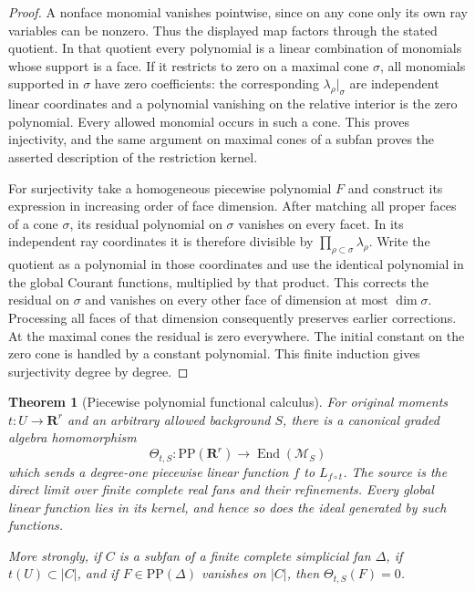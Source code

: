 \documentclass[11pt,a4paper]{article}
\numberwithin{equation}{section}
\newtheorem{theorem}{Theorem}[section]
\theoremstyle{definition}
\theoremstyle{remark}
\begin{document}
\begin{proof}
A nonface monomial vanishes pointwise, since on any cone
only its own ray variables can be nonzero. Thus the
displayed map factors through the stated quotient.
In that quotient every polynomial is a linear combination
of monomials whose support is a face. If it restricts to
zero on a maximal cone $\sigma$, all monomials supported
in $\sigma$ have zero coefficients: the corresponding
$\lambda_\rho|_\sigma$ are independent linear coordinates
and a polynomial vanishing on the relative interior is
the zero polynomial. Every allowed monomial occurs in
such a cone. This proves injectivity, and the same
argument on maximal cones of a subfan proves the asserted
description of the restriction kernel.

For surjectivity take a homogeneous piecewise polynomial
$F$ and construct its expression in increasing order of
face dimension. After matching all proper faces of a
cone $\sigma$, its residual polynomial on $\sigma$
vanishes on every facet. In its independent ray
coordinates it is therefore divisible by
$\prod_{\rho\subset\sigma}\lambda_\rho$.
Write the quotient as a polynomial in those coordinates
and use the identical polynomial in the global Courant
functions, multiplied by that product. This corrects
the residual on $\sigma$ and vanishes on every other
face of dimension at most $\dim\sigma$. Processing all
faces of that dimension consequently preserves earlier
corrections. At the maximal cones the residual is zero
everywhere. The initial constant on the zero cone is
handled by a constant polynomial. This finite induction
gives surjectivity degree by degree.
\end{proof}

\begin{theorem}[Piecewise polynomial functional calculus]
\label{thm:r6-piecewise-polynomial-operator}
For original moments $t:U\to\mathbf R^r$ and an arbitrary
allowed background $S$, there is a canonical graded
algebra homomorphism
\[
 \Theta_{t,S}:\mathrm{PP}(\mathbf R^r)
                            \longrightarrow\operatorname{End}(\mathscr M_S)
\]
which sends a degree-one piecewise linear function $f$
to $L_{f\circ t}$. The source is the direct limit over
finite complete real fans and their refinements. Every
global linear function lies in its kernel, and hence so
does the ideal generated by such functions.

More strongly, if $C$ is a subfan of a finite complete
simplicial fan $\Delta$, if $t(U)\subset|C|$, and if
$F\in\mathrm{PP}(\Delta)$ vanishes on $|C|$, then
$\Theta_{t,S}(F)=0$.
\end{theorem}
\end{document}
